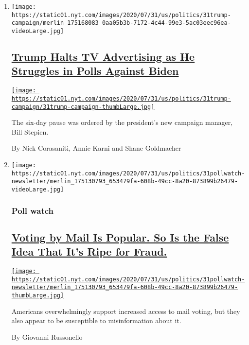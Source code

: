 \begin{enumerate}
\def\labelenumi{\arabic{enumi}.}
\item
  \texttt{[image: https://static01.nyt.com/images/2020/07/31/us/politics/31trump-campaign/merlin\_175168083\_0aa05b3b-7172-4c44-99e3-5ac03eec96ea-videoLarge.jpg]}

  \hypertarget{trump-halts-tv-advertising-as-he-struggles-in-polls-against-biden}{%
  \subsection{\texorpdfstring{\href{/2020/07/31/us/politics/trump-campaign-tv-advertising.html}{Trump
  Halts TV Advertising as He Struggles in Polls Against
  Biden}}{Trump Halts TV Advertising as He Struggles in Polls Against Biden}}\label{trump-halts-tv-advertising-as-he-struggles-in-polls-against-biden}}

  \href{/2020/07/31/us/politics/trump-campaign-tv-advertising.html}{\texttt{[image: https://static01.nyt.com/images/2020/07/31/us/politics/31trump-campaign/31trump-campaign-thumbLarge.jpg]}}

  The six-day pause was ordered by the president's new campaign manager,
  Bill Stepien.

  By Nick Corasaniti, Annie Karni and Shane Goldmacher
\item
  \texttt{[image: https://static01.nyt.com/images/2020/07/31/us/politics/31pollwatch-newsletter/merlin\_175130793\_653479fa-608b-49cc-8a20-873899b26479-videoLarge.jpg]}

  \hypertarget{poll-watch}{%
  \subsubsection{Poll watch}\label{poll-watch}}

  \hypertarget{voting-by-mail-is-popular-so-is-the-false-idea-that-its-ripe-for-fraud}{%
  \subsection{\texorpdfstring{\href{/2020/07/31/us/politics/trump-mail-voting-fraud.html}{Voting
  by Mail Is Popular. So Is the False Idea That It's Ripe for
  Fraud.}}{Voting by Mail Is Popular. So Is the False Idea That It's Ripe for Fraud.}}\label{voting-by-mail-is-popular-so-is-the-false-idea-that-its-ripe-for-fraud}}

  \href{/2020/07/31/us/politics/trump-mail-voting-fraud.html}{\texttt{[image: https://static01.nyt.com/images/2020/07/31/us/politics/31pollwatch-newsletter/merlin\_175130793\_653479fa-608b-49cc-8a20-873899b26479-thumbLarge.jpg]}}

  Americans overwhelmingly support increased access to mail voting, but
  they also appear to be susceptible to misinformation about it.

  By Giovanni Russonello
\end{enumerate}

